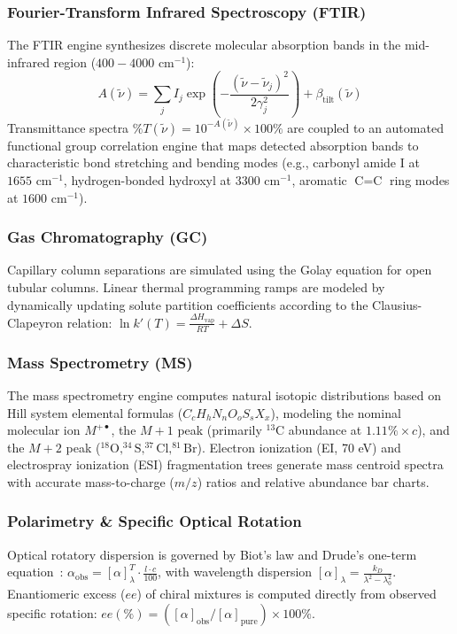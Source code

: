 \documentclass[final,5p,times,twocolumn]{elsarticle}
\begin{document}
\subsubsection{Fourier-Transform Infrared Spectroscopy (FTIR)}
The FTIR engine synthesizes discrete molecular absorption bands in the mid-infrared region ($400 - 4000 \text{ cm}^{-1}$):
\begin{equation}
A(\tilde{\nu}) = \sum_j I_j \exp\left(-\frac{(\tilde{\nu} - \tilde{\nu}_j)^2}{2 \gamma_j^2}\right) + \beta_{\text{tilt}}(\tilde{\nu})
\end{equation}
Transmittance spectra $\%T(\tilde{\nu}) = 10^{-A(\tilde{\nu})} \times 100\%$ are coupled to an automated functional group correlation engine that maps detected absorption bands to characteristic bond stretching and bending modes (e.g., carbonyl amide I at $1655 \text{ cm}^{-1}$, hydrogen-bonded hydroxyl at $3300 \text{ cm}^{-1}$, aromatic $\text{C}=\text{C}$ ring modes at $1600 \text{ cm}^{-1}$).

\subsubsection{Gas Chromatography (GC)}
Capillary column separations are simulated using the Golay equation for open tubular columns. Linear thermal programming ramps are modeled by dynamically updating solute partition coefficients according to the Clausius-Clapeyron relation: $\ln k'(T) = \frac{\Delta H_{\text{vap}}}{R T} + \Delta S$.

\subsubsection{Mass Spectrometry (MS)}
The mass spectrometry engine computes natural isotopic distributions based on Hill system elemental formulas ($C_c H_h N_n O_o S_s X_x$), modeling the nominal molecular ion $M^{+\bullet}$, the $M+1$ peak (primarily $^{13}\text{C}$ abundance at $1.11\% \times c$), and the $M+2$ peak ($^{18}\text{O}, ^{34}\text{S}, ^{37}\text{Cl}, ^{81}\text{Br}$). Electron ionization (EI, 70 eV) and electrospray ionization (ESI) fragmentation trees generate mass centroid spectra with accurate mass-to-charge ($m/z$) ratios and relative abundance bar charts.

\subsubsection{Polarimetry \& Specific Optical Rotation}
Optical rotatory dispersion is governed by Biot's law and Drude's one-term equation~\cite{drude1902theory}: $\alpha_{\text{obs}} = [\alpha]_\lambda^T \cdot \frac{l \cdot c}{100}$, with wavelength dispersion $[\alpha]_\lambda = \frac{k_D}{\lambda^2 - \lambda_0^2}$. Enantiomeric excess ($ee$) of chiral mixtures is computed directly from observed specific rotation: $ee(\%) = ([\alpha]_{\text{obs}} / [\alpha]_{\text{pure}}) \times 100\%$.
\end{document}
